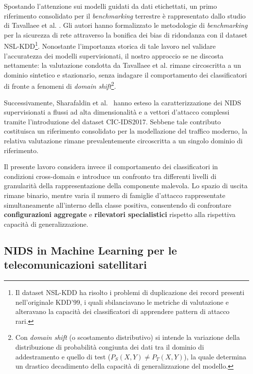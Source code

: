 Spostando l'attenzione sui modelli guidati da dati etichettati, un primo riferimento consolidato per il \textit{benchmarking} terrestre è rappresentato dallo studio di Tavallaee et al. \cite{tavallaee2009}. 
Gli autori hanno formalizzato le metodologie di \textit{benchmarking} per la sicurezza di rete attraverso la bonifica dei bias di ridondanza con il dataset NSL-KDD\footnote{Il dataset NSL-KDD ha risolto i problemi di duplicazione dei record presenti nell'originale KDD'99, i quali sbilanciavano le metriche di valutazione e alteravano la capacità dei classificatori di apprendere pattern di attacco rari.}. 
Nonostante l'importanza storica di tale lavoro nel validare l'accuratezza dei modelli supervisionati, il nostro approccio se ne discosta nettamente: la valutazione condotta da Tavallaee et al. rimane circoscritta a un dominio sintetico e stazionario, senza indagare il comportamento dei classificatori di fronte a fenomeni di \textit{domain shift}\footnote{Con \textit{domain shift} (o scostamento distributivo) si intende la variazione della distribuzione di probabilità congiunta dei dati tra il dominio di addestramento e quello di test ($P_S(X, Y) \neq P_T(X,Y)$), la quale determina un drastico decadimento della capacità di generalizzazione del modello.}.

Successivamente, Sharafaldin et al.~\cite{sharafaldin2018} hanno esteso la caratterizzazione dei NIDS supervisionati a flussi ad alta dimensionalità e a vettori d'attacco complessi tramite l'introduzione del dataset CIC-IDS2017.
Sebbene tale contributo costituisca un riferimento consolidato per la modellazione del traffico moderno, la relativa valutazione rimane prevalentemente circoscritta a un singolo dominio di riferimento.

Il presente lavoro considera invece il comportamento dei classificatori in condizioni cross-domain e introduce un confronto tra differenti livelli di granularità della rappresentazione della componente malevola.
Lo spazio di uscita rimane binario, mentre varia il numero di famiglie d'attacco rappresentate simultaneamente all'interno della classe positiva, consentendo di confrontare \textbf{configurazioni aggregate} e \textbf{rilevatori specialistici} rispetto alla rispettiva capacità di generalizzazione.

\subsection{NIDS in Machine Learning per le telecomunicazioni satellitari}
\label{subsec:ids_satellitari}


